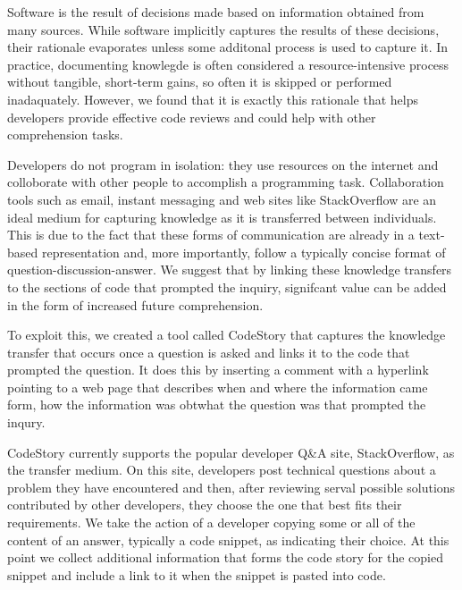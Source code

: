\documentclass[../manifest.tex]{subfiles}
\begin{document}
Software is the result of decisions made based on information obtained from many sources. While software implicitly captures the results of these decisions, their rationale evaporates unless some additonal process is used to capture it. In practice, documenting knowlegde is often considered a resource-intensive process without tangible, short-term gains, so often it is skipped or performed inadaquately\cite{OZ-2008,NH-2007}. However, we found that it is exactly this rationale that helps developers provide effective code reviews and could help with other comprehension tasks.

Developers do not program in isolation: they use resources on the internet and colloborate with other people to accomplish a programming task. Collaboration tools such as email, instant messaging and web sites like StackOverflow are an ideal medium for capturing knowledge as it is transferred between individuals. This is due to the fact that these forms of communication are already in a text-based representation and, more importantly, follow a typically concise format of question-discussion-answer. We suggest that by linking these knowledge transfers to the sections of code that prompted the inquiry, signifcant value can be added in the form of increased future comprehension.

To exploit this, we created a tool called CodeStory that captures the knowledge transfer that occurs once a question is asked and links it to the code that prompted the question. It does this by inserting a comment with a hyperlink pointing to a web page that describes when and where the information came form, how the information was obtwhat the question was that prompted the inqury.

CodeStory currently supports the popular developer Q\&A site, StackOverflow, as the transfer medium. On this site, developers post technical questions about a problem they have encountered and then, after reviewing serval possible solutions contributed by other developers, they choose the one that best fits their requirements. We take the action of a developer copying some or all of the content of an answer, typically a code snippet, as indicating their choice. At this point we collect additional information that forms the code story for the copied snippet and include a link to it when the snippet is pasted into code.
\end{document}
